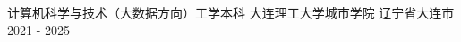 

\begin{cventries}

  \cventry
    {计算机科学与技术（大数据方向）工学本科} %
    {大连理工大学城市学院} %
    {辽宁省大连市} %
    {2021 - 2025} %
    {}

\end{cventries}
